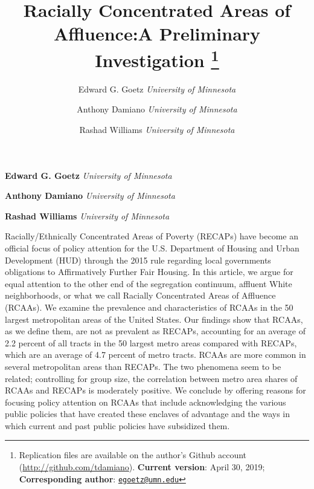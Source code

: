 \documentclass[11pt,]{article}
\title{Racially Concentrated Areas of Affluence:A Preliminary Investigation \thanks{Replication files are available on the author's Github account
(\url{http://github.com/tdamiano}). \textbf{Current version}: April 30,
2019; \textbf{Corresponding author}:
\href{mailto:egoetz@umn.edu}{\nolinkurl{egoetz@umn.edu}}}  }
\author{\Large Edward G. Goetz\vspace{0.05in} \newline\normalsize\emph{University of Minnesota}   \and \Large Anthony Damiano\vspace{0.05in} \newline\normalsize\emph{University of Minnesota}   \and \Large Rashad Williams\vspace{0.05in} \newline\normalsize\emph{University of Minnesota}  }
\date{}
\newcommand*{\authorfont}{\fontfamily{phv}\selectfont}
\renewenvironment{abstract}
 {{%
    \setlength{\leftmargin}{0mm}
    \setlength{\rightmargin}{\leftmargin}%
  }%
  \relax}
 {\endlist}
\begin{document}
%

{%
\setlength{\parindent}{0pt}
\thispagestyle{plain}
{\fontsize{18}{20}\selectfont\raggedright
\maketitle  %

}

{
   \vskip 13.5pt\relax \normalsize\fontsize{11}{12}
\textbf{\authorfont Edward G. Goetz} \hskip 15pt \emph{\small University of Minnesota}   \par \textbf{\authorfont Anthony Damiano} \hskip 15pt \emph{\small University of Minnesota}   \par \textbf{\authorfont Rashad Williams} \hskip 15pt \emph{\small University of Minnesota}   

}

}








\begin{abstract}

    \hbox{\vrule height .2pt width 39.14pc}

    \vskip 8.5pt %

\noindent Racially/Ethnically Concentrated Areas of Poverty (RECAPs) have become
an official focus of policy attention for the U.S. Department of Housing
and Urban Development (HUD) through the 2015 rule regarding local
governments obligations to Affirmatively Further Fair Housing. In this
article, we argue for equal attention to the other end of the
segregation continuum, affluent White neighborhoods, or what we call
Racially Concentrated Areas of Affluence (RCAAs). We examine the
prevalence and characteristics of RCAAs in the 50 largest metropolitan
areas of the United States. Our findings show that RCAAs, as we define
them, are not as prevalent as RECAPs, accounting for an average of 2.2
percent of all tracts in the 50 largest metro areas compared with
RECAPs, which are an average of 4.7 percent of metro tracts. RCAAs are
more common in several metropolitan areas than RECAPs. The two phenomena
seem to be related; controlling for group size, the correlation between
metro area shares of RCAAs and RECAPs is moderately positive. We
conclude by offering reasons for focusing policy attention on RCAAs that
include acknowledging the various public policies that have created
these enclaves of advantage and the ways in which current and past
public policies have subsidized them.


    \hbox{\vrule height .2pt width 39.14pc}


\end{abstract}
\end{document}
